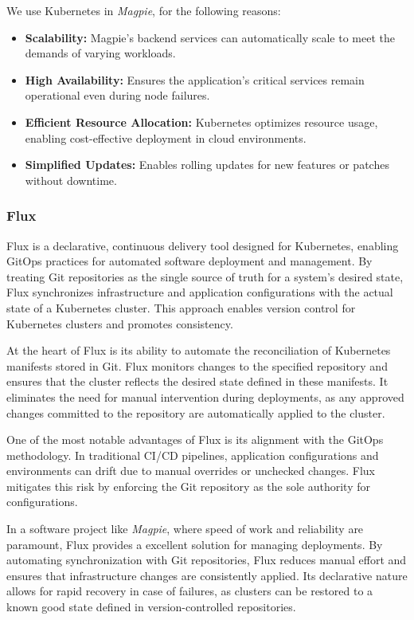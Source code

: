 We use Kubernetes in \textit{Magpie}, for the following reasons:
\begin{itemize}
    \item \textbf{Scalability:} Magpie's backend services can automatically
    scale to meet the demands of varying workloads.
    \item \textbf{High Availability:} Ensures the application's critical
    services remain operational even during node failures.
    \item \textbf{Efficient Resource Allocation:} Kubernetes optimizes resource
    usage, enabling cost-effective deployment in cloud environments.
    \item \textbf{Simplified Updates:} Enables rolling updates for new features
    or patches without downtime.
\end{itemize}

\subsubsection{Flux}

Flux is a declarative, continuous delivery tool designed for Kubernetes,
enabling GitOps practices for automated software deployment and management. By
treating Git repositories as the single source of truth for a system's desired
state, Flux synchronizes infrastructure and application configurations with the
actual state of a Kubernetes cluster. This approach enables version control
for Kubernetes clusters and promotes consistency.

At the heart of Flux is its ability to automate the reconciliation of Kubernetes
manifests stored in Git. Flux monitors changes to the specified repository and
ensures that the cluster reflects the desired state defined in these manifests.
It eliminates the need for manual intervention during deployments, as any
approved changes committed to the repository are automatically applied to the
cluster.

One of the most notable advantages of Flux is its alignment with the GitOps
methodology. In traditional CI/CD pipelines, application configurations and
environments can drift due to manual overrides or unchecked changes. Flux
mitigates this risk by enforcing the Git repository as the sole authority for
configurations.

In a software project like \textit{Magpie}, where speed of work and reliability
are paramount, Flux provides a excellent solution for managing deployments. By
automating synchronization with Git repositories, Flux reduces manual effort and
ensures that infrastructure changes are consistently applied. Its declarative
nature allows for rapid recovery in case of failures, as clusters can be
restored to a known good state defined in version-controlled repositories.


